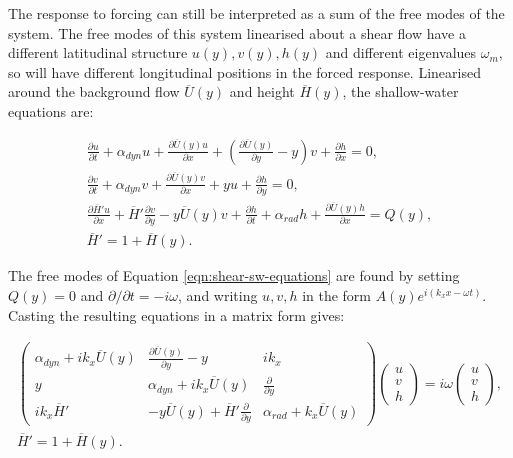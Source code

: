 The response to forcing can still be interpreted as a sum of the free modes of the system. The free modes of this system linearised about a shear flow have a different latitudinal structure $u(y),v(y),h(y)$ and different eigenvalues $\omega_{m}$, so will have different longitudinal positions in the forced response. Linearised around the background flow $\overline{U}(y)$ and height $\overline{H}(y)$, the shallow-water equations are:

\begin{equation}\label{eqn:shear-sw-equations}
    \begin{gathered}
      \frac{\partial u}{\partial t} +  \alpha_{dyn} u + \frac{\partial \overline{U}(y)u}{\partial x} +(\frac{\partial \overline{U}(y)}{\partial y} - y)v + \frac{\partial h}{\partial x} = 0, \\
      \frac{\partial v}{\partial t} +  \alpha_{dyn} v + \frac{\partial \overline{U}(y)v}{\partial x} + y u + \frac{\partial h}{\partial y} = 0, \\
      \frac{\partial \overline{H}' u}{\partial x} + \overline{H}'\frac{\partial v}{\partial y} - y\overline{U}(y) v +\frac{\partial h}{\partial t} +  \alpha_{rad} h + \frac{\partial \overline{U}(y) h}{\partial x} = Q(y), \\
        \overline{H}' = 1+\overline{H}(y).
    \end{gathered}
\end{equation}


The free modes of Equation \ref{eqn:shear-sw-equations} are found by setting $Q(y)=0$ and $\partial /\partial t = -i \omega$, and writing $u,v,h$ in the form $A(y) e^{i(k_{x}x - \omega t)}$. Casting the resulting equations in a matrix form gives:


  \begin{equation}\label{eqn:free-sw-shear}
    \begin{gathered}
      \begin{pmatrix}
      \alpha_{dyn} + i k_{x}\overline{U}(y) & \frac{\partial\overline{U}(y)}{\partial y}-y & i k_{x} \\
      y & \alpha_{dyn} + i k_{x}\overline{U}(y) & \frac{\partial}{\partial y} \\
      i k_{x} \overline{H}' & -y \overline{U}(y) + \overline{H}' \frac{\partial}{\partial y} & \alpha_{rad} + k_{x}\overline{U}(y)
      \end{pmatrix}
      \begin{pmatrix}
      u \\
      v \\
      h
      \end{pmatrix}
      =
      i \omega
      \begin{pmatrix}
      u \\
      v \\
      h
      \end{pmatrix}, \\
        \overline{H}' = 1+\overline{H}(y).
    \end{gathered}
  \end{equation}

